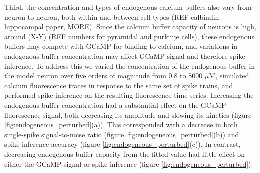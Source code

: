 \documentclass[a4paper,12pt]{article}
\theoremstyle{definition}
\begin{document}
Third, the concentration and types of endogenous calcium buffers also vary from neuron to neuron, both within and between cell types (REF calbindin hippocampal paper, MORE). Since the calcium buffer capacity of neurons is high, around (X-Y) (REF numbers for pyramidal and purkinje cells), these endogenous buffers may compete with GCaMP for binding to calcium, and variations in endogenous buffer concentration may affect GCaMP signal and therefore spike inference. To address this we varied the concentration of the endogenous buffer in the model neuron over five orders of magnitude from $0.8$ to $8000$ $\mu$M, simulated calcium fluorescence traces in response to the same set of spike trains, and performed spike inference on the resulting fluorescence time series. Increasing the endogenous buffer concentration had a substantial effect on the GCaMP fluorescence signal, both decreasing its amplitude and slowing its kinetics (figure \ref{fig:endogeneous_perturbed}(a)). This corresponded with a decrease in both single-spike signal-to-noise ratio (figure \ref{fig:endogeneous_perturbed}(b)) and spike inference accuracy (figure \ref{fig:endogeneous_perturbed}(c)). In contrast, decreasing endogenous buffer capacity from the fitted value had little effect on either the GCaMP signal or spike inference (figure \ref{fig:endogeneous_perturbed}).
\end{document}
